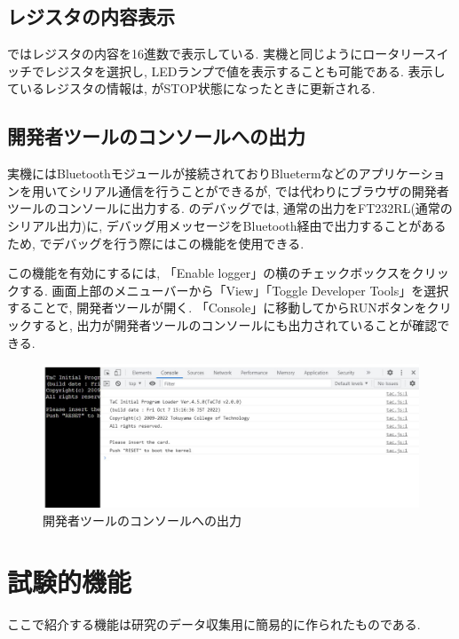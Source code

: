 \subsection{レジスタの内容表示}
\tacsim ではレジスタの内容を16進数で表示している. 実機と同じようにロータリースイッチでレジスタを選択し, LEDランプで値を表示することも可能である. 表示しているレジスタの情報は, \tacsim がSTOP状態になったときに更新される. 

\subsection{開発者ツールのコンソールへの出力}

\tac 実機にはBluetoothモジュールが接続されておりBluetermなどのアプリケーションを用いてシリアル通信を行うことができるが, \tacsim では代わりにブラウザの開発者ツールのコンソールに出力する.
\tacos のデバッグでは, 通常の出力をFT232RL(通常のシリアル出力)に, デバッグ用メッセージをBluetooth経由で出力することがあるため, \tacsim でデバッグを行う際にはこの機能を使用できる.

この機能を有効にするには, 「Enable logger」の横のチェックボックスをクリックする.
画面上部のメニューバーから「View」\rightarrow 「Toggle Developer Tools」を選択することで, 開発者ツールが開く. 「Console」に移動してからRUNボタンをクリックすると, 出力が開発者ツールのコンソールにも出力されていることが確認できる.

\begin{figure}[H]
    \centering
    \includegraphics[width=14cm]{"figs/chapter3-devtools.jpg"}
    \caption{開発者ツールのコンソールへの出力} \label{fig:ch3-devtools}
\end{figure}

\section{試験的機能}

ここで紹介する機能は研究のデータ収集用に簡易的に作られたものである.

